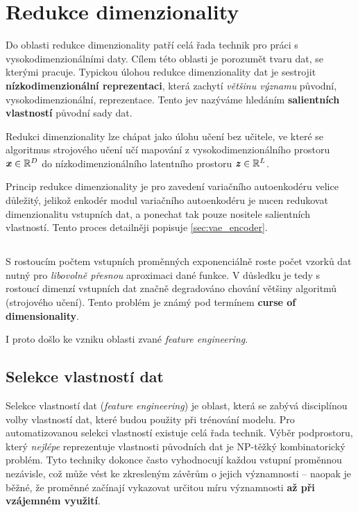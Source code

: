 \section{Redukce dimenzionality}
\label{sec:dimensionality_reduction}

Do oblasti redukce dimenzionality patří celá řada technik pro práci s vysokodimenzionálními daty.
Cílem této oblasti je porozumět tvaru dat, se kterými pracuje.
Typickou úlohou redukce dimenzionality dat je sestrojit \textbf{nízkodimenzionální reprezentaci}, která zachytí \emph{většinu významu} původní, vysokodimenzionální, reprezentace.
Tento jev nazýváme hledáním \textbf{salientních vlastností} původní sady dat. \cite{Phillips2021}

Redukci dimenzionality lze chápat jako úlohu učení bez učitele, ve které se algoritmus strojového učení učí mapování z vysokodimenzionálního prostoru $\textbf{\emph{x}} \in \mathbb{R}^D$ do nízkodimenzionálního latentního prostoru $\textbf{\emph{z}} \in \mathbb{R}^L$. \cite{Murphy2022}

Princip redukce dimenzionality je pro zavedení variačního autoenkodéru velice důležitý, jelikož enkodér modul variačního autoenkodéru je nucen redukovat dimenzionalitu vstupních dat, a ponechat tak pouze nositele salientních vlastností. Tento proces detailněji popisuje \autoref{sec:vae_encoder}.

\subsection{}
S rostoucím počtem vstupních proměnných exponenciálně roste počet vzorků dat nutný pro \emph{libovolně přesnou} aproximaci dané funkce.
V důsledku je tedy s rostoucí dimenzí vstupních dat značně degradováno chování většiny algoritmů (strojového učení).
Tento problém je známý pod termínem \textbf{curse of dimensionality}. \cite{Bellman1957}

I proto došlo ke vzniku oblasti zvané \emph{feature engineering}.
\subsection{Selekce vlastností dat}

Selekce vlastností dat (\emph{feature engineering}) je oblast, která se zabývá disciplínou volby vlastností dat, které budou použity při trénování modelu.
Pro automatizovanou selekci vlastností existuje celá řada technik.
Výběr podprostoru, který \emph{nejlépe} reprezentuje vlastnosti původních dat je NP-těžký kombinatorický problém.
Tyto techniky dokonce často vyhodnocují každou vstupní proměnnou nezávisle, což může vést ke zkresleným závěrům o jejich významnosti – naopak je běžné, že proměnné začínají vykazovat určitou míru významnosti \textbf{až při vzájemném využití}. \cite{Stanczyk2015}

